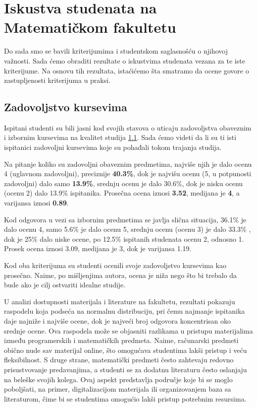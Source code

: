 \documentclass[a4paper]{article}
\begin{document}
{\section{Iskustva studenata na Matematičkom fakultetu}
\label{sec:iskustva}

Do sada smo se bavili kriterijumima i studentskom saglasnošću o njihovoj važnosti. Sada ćemo obraditi rezultate o iskustvima studenata vezana za te iste kriterijume. Na osnovu tih rezultata, istaćićemo šta smatramo da ocene govore o zastupljenosti kriterijuma u praksi.  

\subsection{Zadovoljstvo kursevima}
\label{subsec:zadovoljstvo_iskustva}
Ispitani studenti su bili jasni kod svojih stavova o uticaju zadovoljstva obaveznim i izbornim kursevima na kvalitet studija \ref{subsec:zadovoljstvo_iskustva}. Sada ćemo videti da li su ti isti ispitanici zadovoljni kursevima koje su pohađali tokom trajanja studija.

Na pitanje koliko su zadovoljni obaveznim predmetima, najviše njih je dalo ocenu 4 (uglavnom zadovoljni), preciznije \textbf{40.3\%}, dok je najvišu ocenu (5, u potpunosti zadovoljni) dalo samo \textbf{13.9\%}, srednju ocenu je dalo 30.6\%, dok je nisku ocenu (ocenu 2) dalo 13.9\% ispitanika. Prosečna ocena iznosi \textbf{3.52}, medijana je \textbf{4}, a varijansa iznosi  \textbf{0.89}.

Kod odgovora u vezi sa izbornim predmetima se javlja slična situacija, 36.1\% je dalo ocenu 4, samo 5.6\% je dalo ocenu 5, srednju ocenu (ocenu 3) je dalo 33.3\% , dok je 25\% dalo niske ocene, po 12.5\% ispitanih studenata ocenu 2, odnosno 1. Prosek ocena iznosi 3.09, medijana je 3, dok je varijansa 1.19. 

Kod oba kriterijuma su studenti ocenili svoje zadovoljstvo kursevima kao prosečno. Naime, po mišljenjima autora, ocena je niža nego što bi trebalo da bude ako je cilj ostvariti idealne studije.

U analizi dostupnosti materijala i literature na fakultetu, rezultati pokazuju raspodelu koja podseća na normalnu distribuciju, pri čemu najmanje ispitanika daje najniže i najviše ocene, dok je najveći broj odgovora koncentrisan oko srednje ocene. Ova raspodela može se objasniti razlikama u pristupu materijalima između programerskih i matematičkih predmeta. Naime, računarski predmeti obično nude sav materijal online, što omogućava studentima lakši pristup i veću fleksibilnost. S druge strane, matematički predmeti često zahtevaju redovno prisustvovanje predavanjima, a studenti se za dodatnu literaturu često oslanjaju na beleške svojih kolega. Ovaj aspekt predstavlja područje koje bi se moglo poboljšati, na primer, digitalizacijom materijala ili organizovanjem baza sa literaturom, čime bi se studentima omogućio lakši pristup potrebnim resursima.

}
\end{document}
